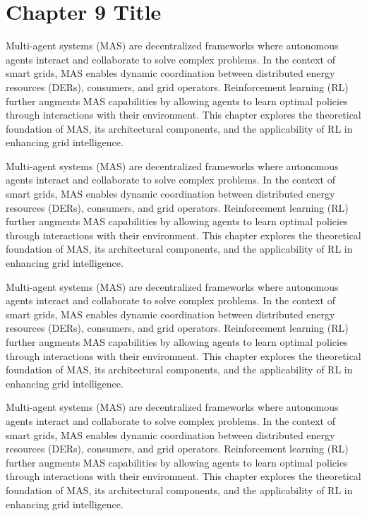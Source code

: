 \chapter{Chapter 9 Title}


Multi-agent systems (MAS) are decentralized frameworks where autonomous agents interact and collaborate to solve complex problems. 
In the context of smart grids, MAS enables dynamic coordination between distributed energy resources (DERs), consumers, and grid operators. 
Reinforcement learning (RL) further augments MAS capabilities by allowing agents to learn optimal policies through interactions with their environment. 
This chapter explores the theoretical foundation of MAS, its architectural components, and the applicability of RL in enhancing grid intelligence.

Multi-agent systems (MAS) are decentralized frameworks where autonomous agents interact and collaborate to solve complex problems. 
In the context of smart grids, MAS enables dynamic coordination between distributed energy resources (DERs), consumers, and grid operators. 
Reinforcement learning (RL) further augments MAS capabilities by allowing agents to learn optimal policies through interactions with their environment. 
This chapter explores the theoretical foundation of MAS, its architectural components, and the applicability of RL in enhancing grid intelligence.

Multi-agent systems (MAS) are decentralized frameworks where autonomous agents interact and collaborate to solve complex problems. 
In the context of smart grids, MAS enables dynamic coordination between distributed energy resources (DERs), consumers, and grid operators. 
Reinforcement learning (RL) further augments MAS capabilities by allowing agents to learn optimal policies through interactions with their environment. 
This chapter explores the theoretical foundation of MAS, its architectural components, and the applicability of RL in enhancing grid intelligence.

Multi-agent systems (MAS) are decentralized frameworks where autonomous agents interact and collaborate to solve complex problems. 
In the context of smart grids, MAS enables dynamic coordination between distributed energy resources (DERs), consumers, and grid operators. 
Reinforcement learning (RL) further augments MAS capabilities by allowing agents to learn optimal policies through interactions with their environment. 
This chapter explores the theoretical foundation of MAS, its architectural components, and the applicability of RL in enhancing grid intelligence.

